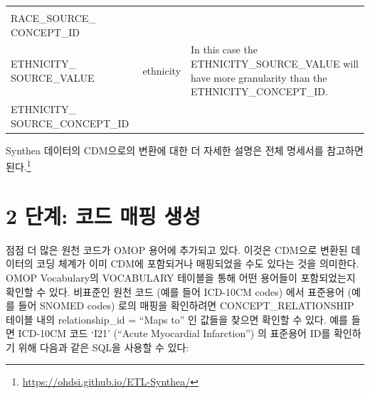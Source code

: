 \documentclass[11pt]{book}
\let\rmarkdownfootnote\footnote%
\def\footnote{\protect\rmarkdownfootnote}
\theoremstyle{definition}
\theoremstyle{definition}
\theoremstyle{definition}
\theoremstyle{remark}
\begin{document}
\begin{longtable}[]{@{}lll@{}}
\begin{minipage}[t]{0.50\columnwidth}
\strut
\end{minipage}\tabularnewline
\begin{minipage}[t]{0.28\columnwidth}\raggedright\strut
RACE\_SOURCE\_ CONCEPT\_ID\strut
\end{minipage} & \begin{minipage}[t]{0.13\columnwidth}\raggedright\strut
\strut
\end{minipage} & \begin{minipage}[t]{0.50\columnwidth}\raggedright\strut
\strut
\end{minipage}\tabularnewline
\begin{minipage}[t]{0.28\columnwidth}\raggedright\strut
ETHNICITY\_ SOURCE\_VALUE\strut
\end{minipage} & \begin{minipage}[t]{0.13\columnwidth}\raggedright\strut
ethnicity\strut
\end{minipage} & \begin{minipage}[t]{0.50\columnwidth}\raggedright\strut
In this case the ETHNICITY\_SOURCE\_VALUE will have more granularity
than the ETHNICITY\_CONCEPT\_ID.\strut
\end{minipage}\tabularnewline
\begin{minipage}[t]{0.28\columnwidth}\raggedright\strut
ETHNICITY\_ SOURCE\_CONCEPT\_ID\strut
\end{minipage} & \begin{minipage}[t]{0.13\columnwidth}\raggedright\strut
\strut
\end{minipage} & \begin{minipage}[t]{0.50\columnwidth}\raggedright\strut
\strut
\end{minipage}\tabularnewline
\bottomrule
\end{longtable}

Synthea 데이터의 CDM으로의 변환에 대한 더 자세한 설명은 전체 명세서를
참고하면 된다.\footnote{\url{https://ohdsi.github.io/ETL-Synthea/}}

\section{2 단계: 코드 매핑 생성}\label{---}

점점 더 많은 원천 코드가 OMOP 용어에 추가되고 있다. 이것은 CDM으로
변환된 데이터의 코딩 체계가 이미 CDM에 포함되거나 매핑되었을 수도 있다는
것을 의미한다. OMOP Vocabulary의 VOCABULARY 테이블을 통해 어떤 용어들이
포함되었는지 확인할 수 있다. 비표준인 원천 코드 (예를 들어 ICD-10CM
codes) 에서 표준용어 (예를 들어 SNOMED codes) 로의 매핑을 확인하려면
CONCEPT\_RELATIONSHIP 테이블 내의 relationship\_id = ``Maps to'' 인
값들을 찾으면 확인할 수 있다. 예를 들면 ICD-10CM 코드 `I21' (``Acute
Myocardial Infarction'') 의 표준용어 ID를 확인하기 위해 다음과 같은
SQL을 사용할 수 있다:
\end{document}
